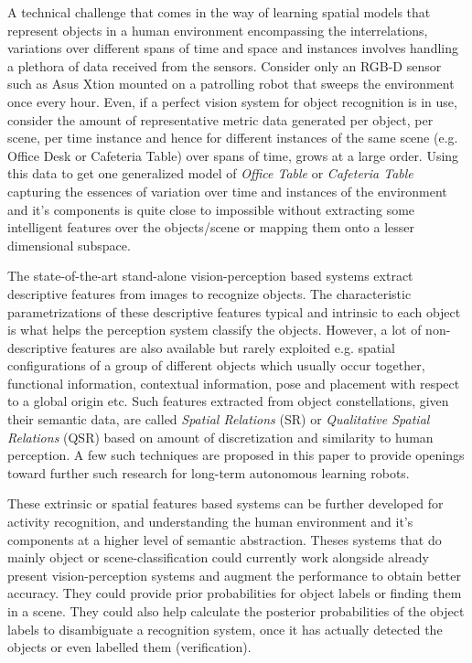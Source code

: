 \documentclass[letterpaper]{article}
\begin{document}
A technical challenge that comes in the way of learning spatial models that represent objects in a human environment encompassing the interrelations, variations over different spans of time and space and instances involves handling a plethora of data received from the sensors. Consider only an RGB-D sensor such as Asus Xtion mounted on a patrolling robot that sweeps the environment once every hour. Even, if a perfect vision system for object recognition is in use, consider the amount of representative metric data generated per object, per scene, per time instance and hence for different instances of the same scene (e.g. Office Desk or Cafeteria Table) over spans of time, grows at a large order. Using this data to get one generalized model of \textit{Office Table} or \textit{Cafeteria Table} capturing the essences of variation over time and instances of the environment and it's components is quite close to impossible without extracting some intelligent features over the objects/scene or mapping them onto a lesser dimensional subspace.

The state-of-the-art stand-alone vision-perception based systems extract descriptive features from images to recognize objects. The characteristic parametrizations of these descriptive features typical and intrinsic to each object is what helps the perception system classify the objects. However, a lot of non-descriptive features are also available but rarely exploited e.g. spatial configurations of a group of different objects which usually occur together, functional information, contextual information, pose and placement with respect to a global origin etc. Such features extracted from object constellations, given their semantic data, are called \textit{Spatial Relations} (SR) or \textit{Qualitative Spatial Relations} (QSR) based on amount of discretization and similarity to human perception. A few such techniques are proposed in this paper to provide openings toward further such research for long-term autonomous learning robots.

These extrinsic or spatial features based systems can be further developed for activity recognition, and understanding the human environment and it's components at a higher level of semantic abstraction. Theses systems that do mainly object or scene-classification could currently work alongside already present vision-perception systems and augment the performance to obtain better accuracy. They could provide prior probabilities for object labels or finding them in a scene. They could also help calculate the posterior probabilities of the object labels to disambiguate a recognition system, once it has actually detected the objects or even labelled them (verification).
\end{document}

